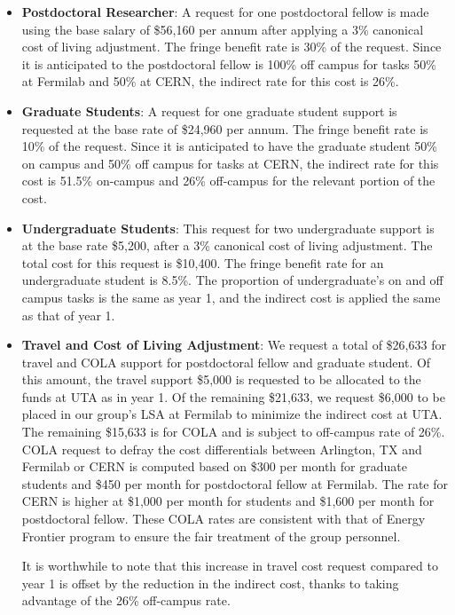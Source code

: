\begin{enumerate}
\begin{itemize}
\item {{\bf Postdoctoral Researcher}: A request for one postdoctoral fellow is made using the base salary of \$56,160 per annum after applying a 3\% canonical cost of living adjustment.  The fringe benefit rate is 30\% of the request.  Since it is anticipated to the postdoctoral fellow is 100\% off campus for tasks 50\% at Fermilab and 50\% at CERN, the indirect rate for this cost is 26\%.} 

\item{{\bf Graduate Students}: A request for one graduate student support is requested at the base rate of \$24,960 per annum.   The fringe benefit rate is 10\% of the request.  Since it is anticipated to have the graduate student 50\% on campus and 50\% off campus for tasks at CERN, the indirect rate for this cost is 51.5\% on-campus and 26\% off-campus for the relevant portion of the cost. }

\item {{\bf Undergraduate Students}: This request for two undergraduate support is at the base rate \$5,200, after a 3\% canonical cost of living adjustment.  The total cost for this request is \$10,400.  The fringe benefit rate for an undergraduate student is 8.5\%.  The proportion of undergraduate’s on and off campus tasks is the same as year 1, and the indirect cost is applied the same as that of year 1.}

\item{{\bf Travel and Cost of Living Adjustment}: We request a total of \$26,633 for travel and COLA support for postdoctoral fellow and graduate student.   Of this amount, the travel support \$5,000 is requested to be allocated to the funds at UTA as in year 1.  Of the remaining \$21,633, we request \$6,000 to be placed in our group’s LSA at Fermilab to minimize the indirect cost at UTA.   The remaining \$15,633 is for COLA and is subject to off-campus rate of 26\%.  COLA request to defray the cost differentials between Arlington, TX and Fermilab or CERN is computed based on \$300 per month for graduate students and \$450 per month for postdoctoral fellow at Fermilab.  The rate for CERN is higher at \$1,000 per month for students and \$1,600 per month for postdoctoral fellow.  These COLA rates are consistent with that of Energy Frontier program to ensure the fair treatment of the group personnel.  

It is worthwhile to note that this increase in travel cost request compared to year 1 is offset by the reduction in the indirect cost, thanks to taking advantage of the 26\% off-campus rate.}


\end{itemize}
\end{enumerate}
